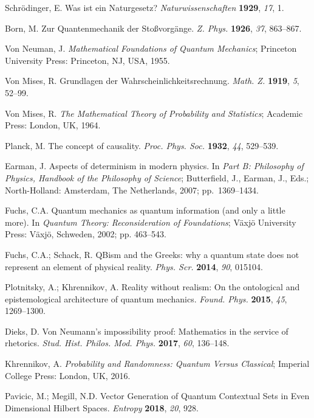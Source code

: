 \documentclass[entropy,editorial,accept,moreauthors,pdftex,10pt,a4paper]{Definitions/mdpi}
\begin{document}
\begin{thebibliography}{999}
Schr\"odinger, E. {W}as ist ein {N}aturgesetz?
{\em Naturwissenschaften} \textbf{1929}, \emph{17}, 1.

Born, M. Zur {Q}uantenmechanik der {S}to{\ss}vorg{\"{a}}nge.
{\em Z. Phys.} \textbf{1926}, \emph{37}, 863--867.

  Von Neuman, J. {\it Mathematical Foundations of Quantum Mechanics};  Princeton University Press: Princeton, NJ, USA, 1955.

 Von Mises, R.  Grundlagen der Wahrscheinlichkeitsrechnung. {\it Math. Z.} {\bf 1919}, {\it 5}, 52--99.

 Von Mises, R. {\it The Mathematical Theory of Probability and Statistics};
Academic Press:  London, UK, 1964.

Planck, M. The concept of causality. {\em Proc. Phys. Soc.} \textbf{1932}, \emph{44}, 529--539.

Earman, J. Aspects of determinism in modern physics.  In \emph{{P}art {B}: Philosophy of
  Physics, Handbook of the Philosophy of Science}; Butterfield, J., Earman, J., Eds.; North-Holland: Amsterdam, The Netherlands, 2007; \mbox{pp. 1369--1434.}

   Fuchs, C.A.  Quantum mechanics as quantum information (and only a little more). In {\it Quantum Theory: Reconsideration of Foundations}; V\"axj\"o University Press: V\"axj\"o, Schweden, 2002; pp. 463--543.

   Fuchs, C.A.;  Schack, R. QBism and the Greeks: why a quantum state does not represent an element
of physical reality. {\it Phys. Scr.} {\bf 2014}, {\it 90},  015104.

 Plotnitsky, A.;  Khrennikov, A.
Reality without realism: On the ontological and epistemological architecture of quantum mechanics. {\it Found. Phys.} {\bf  2015}, {\it 45}, 1269--1300.

Dieks, D. {V}on {N}eumann's impossibility proof: {M}athematics in the service
  of rhetorics.
{\em Stud. Hist. Philos. Mod. Phys.} \textbf{2017}, \emph{60}, 136--148.

  Khrennikov, A. {\it Probability and Randomness: Quantum Versus Classical};
Imperial College Press: London, UK, 2016.


 Pavicic, M.;  Megill, N.D.  Vector Generation of Quantum Contextual Sets in Even Dimensional Hilbert Spaces.  {\it Entropy} {\bf 2018}, {\it 20}, 928.


\end{thebibliography}
\end{document}
